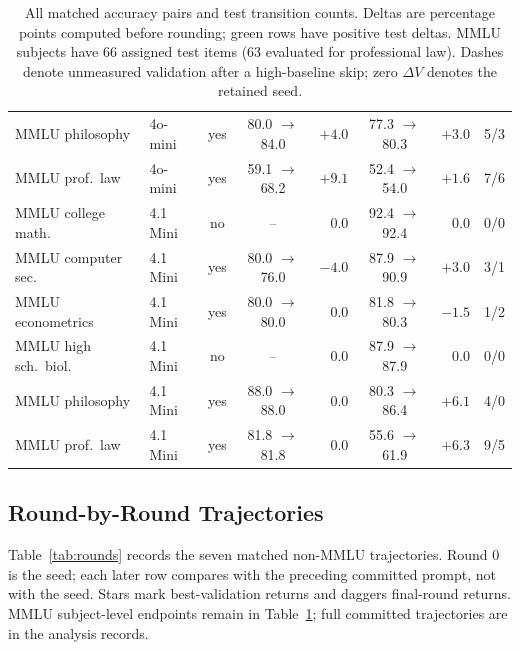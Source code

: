 \documentclass[11pt]{article}
\begin{document}
\begin{table}[!tp]
\begin{tabular}{llccrcrc}
\rowcolor{softgreen}MMLU philosophy & 4o-mini & yes & 80.0 $\rightarrow$ 84.0 & $+4.0$ & 77.3 $\rightarrow$ 80.3 & $+3.0$ & 5/3 \\
\rowcolor{softgreen}MMLU prof.\ law & 4o-mini & yes & 59.1 $\rightarrow$ 68.2 & $+9.1$ & 52.4 $\rightarrow$ 54.0 & $+1.6$ & 7/6 \\
\midrule
MMLU college math. & 4.1 Mini & no & -- & 0.0 & 92.4 $\rightarrow$ 92.4 & 0.0 & 0/0 \\
\rowcolor{softgreen}MMLU computer sec. & 4.1 Mini & yes & 80.0 $\rightarrow$ 76.0 & $-4.0$ & 87.9 $\rightarrow$ 90.9 & $+3.0$ & 3/1 \\
MMLU econometrics & 4.1 Mini & yes & 80.0 $\rightarrow$ 80.0 & 0.0 & 81.8 $\rightarrow$ 80.3 & $-1.5$ & 1/2 \\
MMLU high sch.\ biol. & 4.1 Mini & no & -- & 0.0 & 87.9 $\rightarrow$ 87.9 & 0.0 & 0/0 \\
\rowcolor{softgreen}MMLU philosophy & 4.1 Mini & yes & 88.0 $\rightarrow$ 88.0 & 0.0 & 80.3 $\rightarrow$ 86.4 & $+6.1$ & 4/0 \\
\rowcolor{softgreen}MMLU prof.\ law & 4.1 Mini & yes & 81.8 $\rightarrow$ 81.8 & 0.0 & 55.6 $\rightarrow$ 61.9 & $+6.3$ & 9/5 \\
\bottomrule
\end{tabular}
\caption{All matched accuracy pairs and test transition counts. Deltas are percentage points computed before rounding;
green rows have positive test deltas. MMLU subjects have 66 assigned test items (63 evaluated for professional law).
Dashes denote unmeasured validation after a high-baseline skip; zero $\Delta V$ denotes the retained seed.}
\label{tab:pergap}
\end{table}

\FloatBarrier
\subsection{Round-by-Round Trajectories}
\label{app:rounds}
Table~\ref{tab:rounds} records the seven matched non-MMLU trajectories. Round 0 is the seed; each later row compares
with the preceding committed prompt, not with the seed. Stars mark best-validation returns and daggers final-round
returns. MMLU subject-level endpoints remain in Table~\ref{tab:pergap}; full committed trajectories are in the analysis records.
\end{document}
